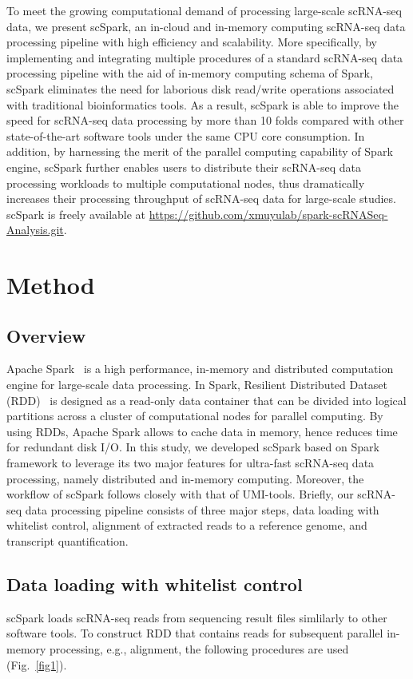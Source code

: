 \documentclass[conference]{IEEEtran}
\begin{document}
To meet the growing computational demand of processing large-scale scRNA-seq data, we present scSpark, an in-cloud and in-memory computing scRNA-seq data processing pipeline with high efficiency and scalability. 
More specifically, by implementing and integrating multiple procedures of a standard scRNA-seq data processing pipeline with the aid of in-memory computing schema of Spark, scSpark eliminates the need for laborious disk read/write operations associated with traditional bioinformatics tools. 
As a result, scSpark is able to improve the speed for scRNA-seq data processing by more than 10 folds compared with other state-of-the-art software tools under the same CPU core consumption. In addition, by harnessing the merit of the parallel computing capability of Spark engine, scSpark further enables users to distribute their scRNA-seq data processing workloads to multiple computational nodes, thus dramatically increases their processing throughput of scRNA-seq data for large-scale studies. 
scSpark is freely available at \url{https://github.com/xmuyulab/spark-scRNASeq-Analysis.git}.

\section{Method}
\subsection{Overview}
Apache Spark~\cite{zaharia2010spark} is a high performance, in-memory and distributed computation engine for large-scale data processing. 
In Spark, Resilient Distributed Dataset (RDD)~\cite{Zaharia2012Resilient} is designed as a read-only data container that can be divided into logical partitions across a cluster of computational nodes for parallel computing. 
By using RDDs, Apache Spark allows to cache data in memory, hence reduces time for redundant disk I/O.
In this study, we developed scSpark based on Spark framework to leverage its two major features for ultra-fast scRNA-seq data processing, namely distributed and in-memory computing. 
Moreover, the workflow of scSpark follows closely with that of UMI-tools. Briefly, our scRNA-seq data processing pipeline consists of three major steps, data loading with whitelist control, alignment of extracted reads to a reference genome, and transcript quantification. 

\subsection{Data loading with whitelist control}
scSpark loads scRNA-seq reads from sequencing result files simlilarly to other software tools. To construct RDD that contains reads for subsequent parallel in-memory processing, e.g., alignment, the following procedures are used (Fig.~\ref{fig1}).
\end{document}
